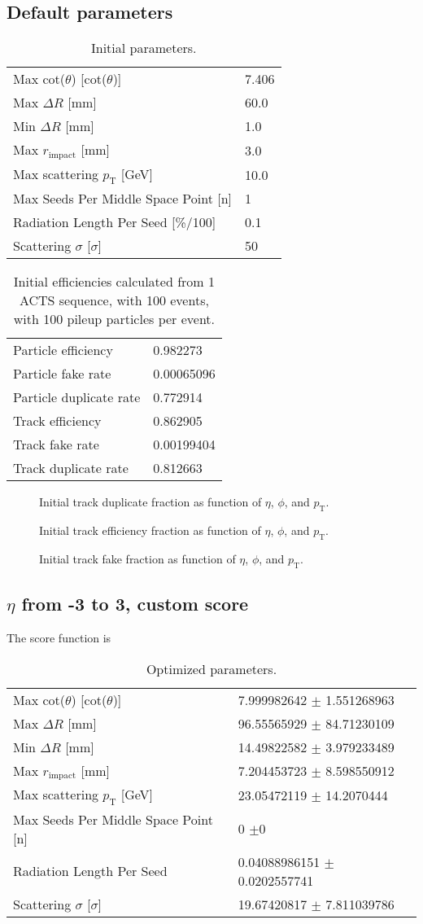 \documentclass{article}
\newcommand{\pic}[2]{\beg{center}{\texttt{[image: \#2]}}}
\newcommand{\figpic}[3]{
\begin{figure}[H]
\begin{center}
\pic{#1}{#2}
\caption{#3}
\end{center}
\end{figure}}
\newcommand{\pt}[0]{p_\textrm{T}}
\newcommand{\figtab}[3]{
\begin{table}[H]
\begin{tabular}{#1}
#2
\end{tabular}
\caption{#3}
\end{table}}
\begin{document}
\subsection{Default parameters}
\figtab{l l}{Max \textrm{cot}($\theta$) [\textrm{cot}($\theta$)] & 7.406\\
Max $\Delta R$ [mm] & 60.0\\
Min $\Delta R$ [mm]  & 1.0\\
Max $r_\textrm{impact}$ [mm] & 3.0\\
Max scattering $\pt$ [GeV] & 10.0\\
Max Seeds Per Middle Space Point [n] & 1\\
Radiation Length Per Seed [\%/100] & 0.1\\
Scattering $\sigma$ [$\sigma$] & 50
}{\label{192837a}Initial parameters.}
\figtab{l l}{
Particle efficiency &0.982273\\
Particle fake rate &0.00065096\\
Particle duplicate rate &0.772914\\
Track efficiency &0.862905\\
Track fake rate &0.00199404\\
Track duplicate rate &0.812663
}{Initial efficiencies calculated from 1 ACTS sequence, with 100 events, with 100 pileup particles per event.}
\figpic{4cm}{/home/user1/time/2023-02-23/2023-02-23-11-14/single/dup.png}{Initial track duplicate fraction as function of $\eta$, $\phi$, and $\pt$.}
\figpic{4cm}{/home/user1/time/2023-02-23/2023-02-23-11-14/single/eff.png}{Initial track efficiency fraction as function of $\eta$, $\phi$, and $\pt$.}
\figpic{4cm}{/home/user1/time/2023-02-23/2023-02-23-11-14/single/fak.png}{Initial track fake fraction as function of $\eta$, $\phi$, and $\pt$.}
\subsection{$\eta$ from -3 to 3, custom score}
The score function is
\figtab{l l}{
Max \textrm{cot}($\theta$) [\textrm{cot}($\theta$)] & 7.999982642 $\pm$ 1.551268963\\
Max $\Delta R$ [mm] & 96.55565929 $\pm$ 84.71230109\\
Min $\Delta R$ [mm]  & 14.49822582 $\pm$ 3.979233489\\
Max $r_\textrm{impact}$ [mm] & 7.204453723 $\pm$ 8.598550912\\
Max scattering $p_{\textrm{T}}$ [GeV] & 23.05472119 $\pm$ 14.2070444\\
Max Seeds Per Middle Space Point [n] & 0 $\pm$0\\
Radiation Length Per Seed & 0.04088986151 $\pm$ 0.0202557741\\
Scattering $\sigma$ [$\sigma$] & 19.67420817 $\pm$ 7.811039786\\
}{Optimized parameters.}
\end{document}
